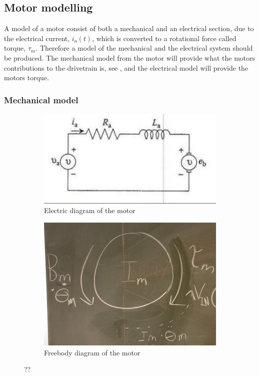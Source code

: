 \subsection{Motor modelling}
A model of a motor consist of both a mechanical and an electrical section, due to the electrical current, $i_a(t)$, which is converted to a rotational force called torque, $\tau_m$. Therefore a model of the mechanical and the electrical system should be produced. The mechanical model from the motor will provide what the motors contributions to the drivetrain is, see , and the electrical model will provide the motors torque.

\subsubsection{Mechanical model}



\begin{figure}[H]
	\setcounter{subfigure}{0}
	\centering
	\begin{subfigure}{.45\textwidth}
		\centering
		\includegraphics[width=\linewidth]{figures/MotorElektrikDiagram.jpg}
		\caption{Electric diagram of the motor}
		\label{fig:MotorElectric}
	\end{subfigure}
	\hfill
	\begin{subfigure}{.45\textwidth}
		\centering
		\includegraphics[width=\linewidth]{figures/MotorFreeBodyDiagram.jpg}
		\caption{Freebody diagram of the motor}
		\label{fig:MotorFreeBody}
	\end{subfigure}
	\caption{??}
	\label{fig:MotorElecFree}
\end{figure}

